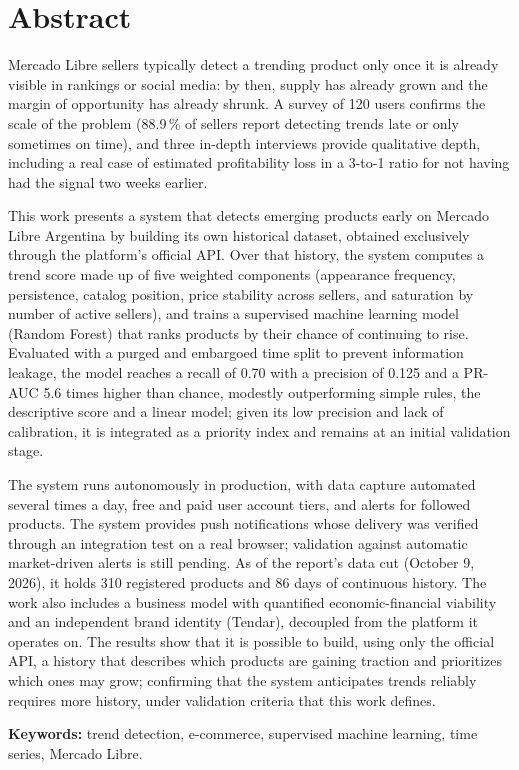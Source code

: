 \chapter*{Abstract}

\noindent
Mercado Libre sellers typically detect a trending product only once it is already visible in rankings or social media: by then, supply has already grown and the margin of opportunity has already shrunk. A survey of 120 users confirms the scale of the problem (88.9\,\% of sellers report detecting trends late or only sometimes on time), and three in-depth interviews provide qualitative depth, including a real case of estimated profitability loss in a 3-to-1 ratio for not having had the signal two weeks earlier.

This work presents a system that detects emerging products early on Mercado Libre Argentina by building its own historical dataset, obtained exclusively through the platform's official API. Over that history, the system computes a trend score made up of five weighted components (appearance frequency, persistence, catalog position, price stability across sellers, and saturation by number of active sellers), and trains a supervised machine learning model (Random Forest) that ranks products by their chance of continuing to rise. Evaluated with a purged and embargoed time split to prevent information leakage, the model reaches a recall of 0.70 with a precision of 0.125 and a PR-AUC 5.6 times higher than chance, modestly outperforming simple rules, the descriptive score and a linear model; given its low precision and lack of calibration, it is integrated as a priority index and remains at an initial validation stage.

The system runs autonomously in production, with data capture automated several times a day, free and paid user account tiers, and alerts for followed products. The system provides push notifications whose delivery was verified through an integration test on a real browser; validation against automatic market-driven alerts is still pending. As of the report's data cut (October 9, 2026), it holds 310 registered products and 86 days of continuous history. The work also includes a business model with quantified economic-financial viability and an independent brand identity (Tendar), decoupled from the platform it operates on. The results show that it is possible to build, using only the official API, a history that describes which products are gaining traction and prioritizes which ones may grow; confirming that the system anticipates trends reliably requires more history, under validation criteria that this work defines.

\vspace{0.5cm}
\noindent\textbf{Keywords:} trend detection, e-commerce, supervised machine learning, time series, Mercado Libre.